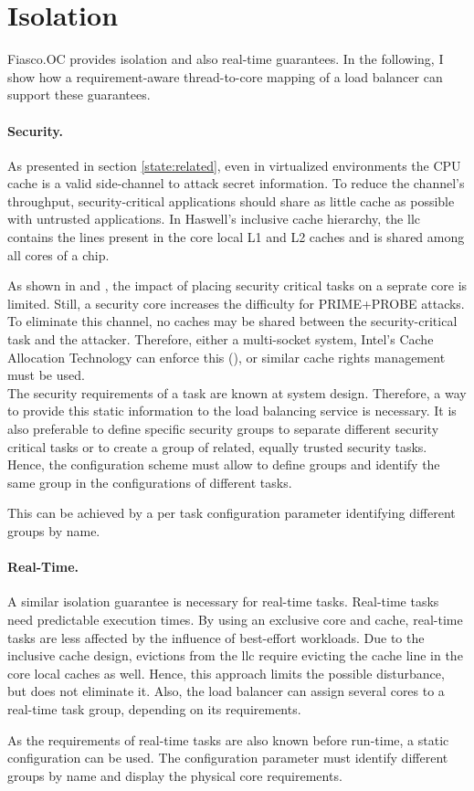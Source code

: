\section{Isolation}
\label{design:isolation}

Fiasco.OC provides isolation and also real-time guarantees.
In the following, I show how a requirement-aware thread-to-core mapping of a
load balancer can support these guarantees.

\paragraph{Security.}
As presented in section \ref{state:related}, even in virtualized environments
the CPU cache is a valid side-channel to attack secret information.
To reduce the channel's throughput, security-critical applications should share
as little cache as possible with untrusted applications.
In Haswell's inclusive cache hierarchy, the \gls{llc} contains the lines
present in the core local L1 and L2 caches and is shared among all cores of a
chip.

As shown in \cite{inci_seriously_2015} and \cite{liu_last-level_2015},
the impact of placing security critical tasks on a seprate core is limited.
Still, a security core increases the difficulty for PRIME+PROBE attacks.
To eliminate this channel, no caches may be shared between the
security-critical task and the attacker.
Therefore, either a multi-socket system, Intel's Cache Allocation
Technology can enforce this (\cite{intel_cat}), or similar cache rights
management must be used.
\\

The security requirements of a task are known at system design.
Therefore, a way to provide this static information to the load balancing
service is necessary.
It is also preferable to define specific security groups to separate different
security critical tasks or to create a group of related, equally trusted
security tasks.
Hence, the configuration scheme must allow to define groups and identify the
same group in the configurations of different tasks.

This can be achieved by a per task configuration parameter identifying
different groups by name.


\paragraph{Real-Time.}
A similar isolation guarantee is necessary for real-time tasks.
Real-time tasks need predictable execution times.
By using an exclusive core and cache, real-time tasks are less affected by the
influence of best-effort workloads.
Due to the inclusive cache design, evictions from the \gls{llc} require
evicting the cache line in the core local caches as well.
Hence, this approach limits the possible disturbance, but does not eliminate it.
Also, the load balancer can assign several cores to a real-time task group, 
depending on its requirements.

As the requirements of real-time tasks are also known before run-time, a static
configuration can be used.
The configuration parameter must identify different groups by name
and display the physical core requirements.
